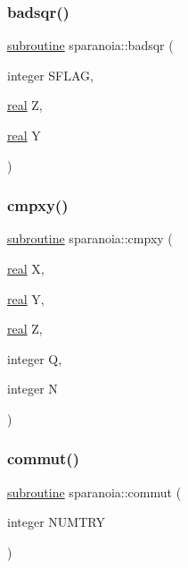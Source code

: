 \mbox{\label{sparanoia_8f90_afb98e3c2e38e0adf86b1de0b4be26416}} 
\subsubsection{\texorpdfstring{badsqr()}{badsqr()}}
{\footnotesize\ttfamily \hyperlink{M__stopwatch_83_8txt_acfbcff50169d691ff02d4a123ed70482}{subroutine} sparanoia\+::badsqr (\begin{DoxyParamCaption}\item[{integer}]{S\+F\+L\+AG,  }\item[{\hyperlink{read__watch_83_8txt_abdb62bde002f38ef75f810d3a905a823}{real}}]{Z,  }\item[{\hyperlink{read__watch_83_8txt_abdb62bde002f38ef75f810d3a905a823}{real}}]{Y }\end{DoxyParamCaption})}

\mbox{\label{sparanoia_8f90_ac62e9d33cdc70d76df2ff4dac081540e}} 
\subsubsection{\texorpdfstring{cmpxy()}{cmpxy()}}
{\footnotesize\ttfamily \hyperlink{M__stopwatch_83_8txt_acfbcff50169d691ff02d4a123ed70482}{subroutine} sparanoia\+::cmpxy (\begin{DoxyParamCaption}\item[{\hyperlink{read__watch_83_8txt_abdb62bde002f38ef75f810d3a905a823}{real}}]{X,  }\item[{\hyperlink{read__watch_83_8txt_abdb62bde002f38ef75f810d3a905a823}{real}}]{Y,  }\item[{\hyperlink{read__watch_83_8txt_abdb62bde002f38ef75f810d3a905a823}{real}}]{Z,  }\item[{integer}]{Q,  }\item[{integer}]{N }\end{DoxyParamCaption})}

\mbox{\label{sparanoia_8f90_a2e6392c39ecf007b0ce79ffe66fbb3ea}} 
\subsubsection{\texorpdfstring{commut()}{commut()}}
{\footnotesize\ttfamily \hyperlink{M__stopwatch_83_8txt_acfbcff50169d691ff02d4a123ed70482}{subroutine} sparanoia\+::commut (\begin{DoxyParamCaption}\item[{integer}]{N\+U\+M\+T\+RY }\end{DoxyParamCaption})}



